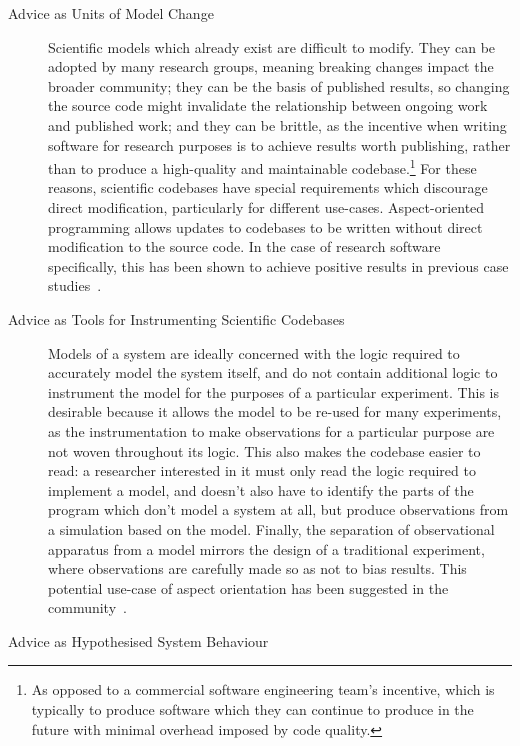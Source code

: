 \begin{description}
  \item[Advice as Units of Model Change] Scientific models which already exist
    are difficult to modify. They can be 
    adopted by many research groups, meaning breaking changes impact the broader
    community; they can be the basis of published results, so changing the source
    code might invalidate the relationship between ongoing work and published work;
    and they can be brittle, as the incentive when writing software for research
    purposes is to achieve results worth publishing, rather than to produce a
    high-quality and maintainable codebase.\footnote{As opposed to a commercial
      software engineering team's incentive, which is typically to produce software
      which they can continue to produce in the future with minimal overhead imposed
    by code quality.} For these reasons, scientific codebases have special
    requirements which discourage direct modification, particularly for
    different use-cases. Aspect-oriented programming allows updates to codebases to be
    written without direct modification to the source code. In the case of
    research software specifically, this has been shown to achieve positive
    results in previous case studies~\cite{ionescu2009aspect}.

  \item[Advice as Tools for Instrumenting Scientific Codebases] Models of a
    system are ideally concerned with the logic required to accurately
    model the system itself, and do not contain additional logic to instrument the
    model for the purposes of a particular experiment. This is desirable because it
    allows the model to be re-used for many experiments, as the instrumentation to
    make observations for a particular purpose are not woven throughout its logic.
    This also makes the codebase easier to read: a researcher interested in it
    must only read the logic required to implement a model, and doesn't
    also have to identify the parts of the program which don't model a system at
    all, but produce observations from a simulation based on the model. Finally,
    the separation of observational apparatus from a model mirrors the design of
    a traditional experiment, where observations are carefully made so as not to
    bias results. This potential use-case of aspect orientation has been
    suggested in the community~\cite{gulyas1999use}.

  \item[Advice as Hypothesised System Behaviour] 
\end{description}




